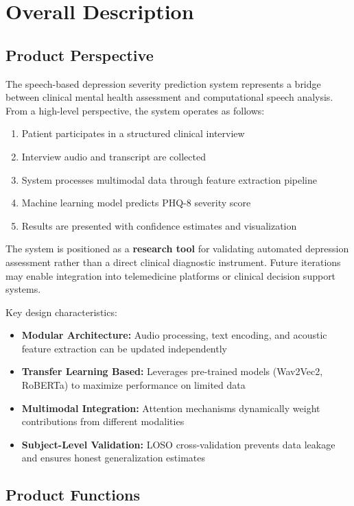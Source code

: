 \documentclass[12pt]{article}
\begin{document}
	\section{Overall Description}

	\subsection{Product Perspective}

	The speech-based depression severity prediction system represents a bridge between clinical mental health assessment and computational speech analysis. From a high-level perspective, the system operates as follows:

	\begin{enumerate}
		\item Patient participates in a structured clinical interview
		\item Interview audio and transcript are collected
		\item System processes multimodal data through feature extraction pipeline
		\item Machine learning model predicts PHQ-8 severity score
		\item Results are presented with confidence estimates and visualization
	\end{enumerate}

	The system is positioned as a \textbf{research tool} for validating automated depression assessment rather than a direct clinical diagnostic instrument. Future iterations may enable integration into telemedicine platforms or clinical decision support systems.

	Key design characteristics:
	\begin{itemize}
		\item \textbf{Modular Architecture:} Audio processing, text encoding, and acoustic feature extraction can be updated independently
		\item \textbf{Transfer Learning Based:} Leverages pre-trained models (Wav2Vec2, RoBERTa) to maximize performance on limited data
		\item \textbf{Multimodal Integration:} Attention mechanisms dynamically weight contributions from different modalities
		\item \textbf{Subject-Level Validation:} LOSO cross-validation prevents data leakage and ensures honest generalization estimates
	\end{itemize}

	\subsection{Product Functions}
\end{document}
